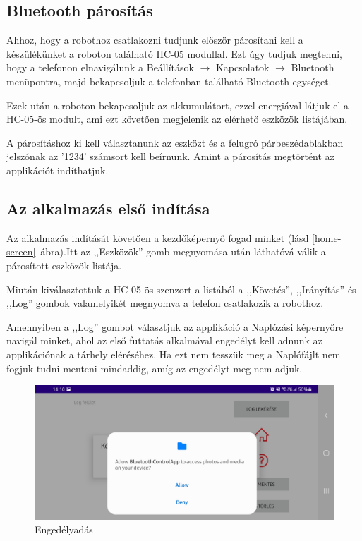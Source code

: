 \documentclass[]{thesis-ekf}
\theoremstyle{definition}
\begin{document}
\subsection{Bluetooth párosítás}
Ahhoz, hogy a robothoz csatlakozni tudjunk először párosítani kell a készülékünket a roboton található HC-05 modullal. Ezt úgy tudjuk megtenni, hogy a telefonon elnavigálunk a Beállítások $\rightarrow$ Kapcsolatok $\rightarrow$ Bluetooth menüpontra, majd bekapcsoljuk a telefonban található Bluetooth egységet.

Ezek után a roboton bekapcsoljuk az akkumulátort, ezzel energiával látjuk el a HC-05-ös modult, ami ezt követően megjelenik az elérhető eszközök listájában.

A párosításhoz ki kell választanunk az eszközt és a felugró párbeszédablakban jelszónak az '1234' számsort kell beírnunk. Amint a párosítás megtörtént az applikációt indíthatjuk.
\subsection{Az alkalmazás első indítása}
Az alkalmazás indítását követően a kezdőképernyő fogad minket (lásd \ref{home-screen}~ábra).Itt az ,,Eszközök'' gomb megnyomása után láthatóvá válik a párosított eszközök listája.

Miután kiválasztottuk a HC-05-ös szenzort a listából a ,,Követés'', ,,Irányítás'' és ,,Log'' gombok valamelyikét megnyomva a telefon csatlakozik a robothoz.

Amennyiben a ,,Log'' gombot választjuk az applikáció a Naplózási képernyőre navigál minket, ahol az első futtatás alkalmával engedélyt kell adnunk az applikációnak a tárhely eléréséhez. Ha ezt nem tesszük meg a Naplófájlt nem fogjuk tudni menteni mindaddig, amíg az engedélyt meg nem adjuk.
\begin{figure}[h]
	\centering
	\includegraphics[width=\columnwidth]{images/app_screen/permission_grant}
	\caption{Engedélyadás}
	\label{grant_permission}
\end{figure}
\end{document}
